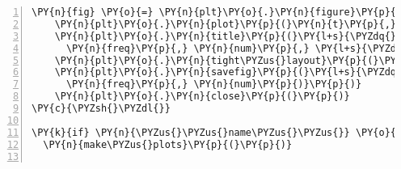 \begin{Verbatim}[commandchars=\\\{\},numbers=left,numbersep=0.5em]
    \PY{n}{fig} \PY{o}{=} \PY{n}{plt}\PY{o}{.}\PY{n}{figure}\PY{p}{(}\PY{n}{figsize}\PY{o}{=}\PY{p}{[}\PY{l+m+mi}{3}\PY{p}{,}\PY{l+m+mi}{2}\PY{p}{]}\PY{p}{)}
    \PY{n}{plt}\PY{o}{.}\PY{n}{plot}\PY{p}{(}\PY{n}{t}\PY{p}{,} \PY{n}{y}\PY{p}{,} \PY{n}{c}\PY{o}{=}\PY{p}{[}\PY{o}{.}\PY{l+m+mi}{3}\PY{p}{,}\PY{o}{.}\PY{l+m+mi}{5}\PY{p}{,}\PY{l+m+mi}{1}\PY{p}{]}\PY{p}{,} \PY{n}{lw}\PY{o}{=}\PY{l+m+mf}{2.5}\PY{p}{)}
    \PY{n}{plt}\PY{o}{.}\PY{n}{title}\PY{p}{(}\PY{l+s}{\PYZdq{}}\PY{l+s}{\PYZob{}\PYZcb{} Hz, \PYZob{}\PYZcb{} Component\PYZob{}\PYZcb{}}\PY{l+s}{\PYZdq{}}\PY{o}{.}\PY{n}{format}\PY{p}{(}
      \PY{n}{freq}\PY{p}{,} \PY{n}{num}\PY{p}{,} \PY{l+s}{\PYZdq{}}\PY{l+s}{\PYZdq{}} \PY{k}{if} \PY{n}{num} \PY{o}{==} \PY{l+m+mi}{1} \PY{k}{else} \PY{l+s}{\PYZdq{}}\PY{l+s}{s}\PY{l+s}{\PYZdq{}}\PY{p}{)}\PY{p}{)}
    \PY{n}{plt}\PY{o}{.}\PY{n}{tight\PYZus{}layout}\PY{p}{(}\PY{p}{)}
    \PY{n}{plt}\PY{o}{.}\PY{n}{savefig}\PY{p}{(}\PY{l+s}{\PYZdq{}}\PY{l+s}{../img/fouriers/\PYZob{}\PYZcb{}\PYZus{}\PYZob{}\PYZcb{}.pdf}\PY{l+s}{\PYZdq{}}\PY{o}{.}\PY{n}{format}\PY{p}{(}
      \PY{n}{freq}\PY{p}{,} \PY{n}{num}\PY{p}{)}\PY{p}{)}
    \PY{n}{plt}\PY{o}{.}\PY{n}{close}\PY{p}{(}\PY{p}{)}
\PY{c}{\PYZsh{}\PYZdl{}}

\PY{k}{if} \PY{n}{\PYZus{}\PYZus{}name\PYZus{}\PYZus{}} \PY{o}{==} \PY{l+s}{\PYZdq{}}\PY{l+s}{\PYZus{}\PYZus{}main\PYZus{}\PYZus{}}\PY{l+s}{\PYZdq{}}\PY{p}{:}
  \PY{n}{make\PYZus{}plots}\PY{p}{(}\PY{p}{)}
  
\end{Verbatim}
